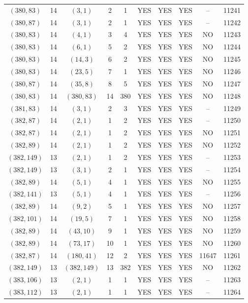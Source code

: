 \begin{longtable}{|c|c|c|c|c|c|c|c|c|c|}
$(380, 83)$ & 14 & $(3, 1)$ & 2 & 1 & YES & YES & YES & -- & 11241\\
$(380, 87)$ & 14 & $(3, 1)$ & 2 & 1 & YES & YES & YES & -- & 11242\\
$(380, 83)$ & 14 & $(4, 1)$ & 3 & 4 & YES & YES & YES & NO & 11243\\
$(380, 83)$ & 14 & $(6, 1)$ & 5 & 2 & YES & YES & YES & NO & 11244\\
$(380, 83)$ & 14 & $(14, 3)$ & 6 & 2 & YES & YES & YES & NO & 11245\\
$(380, 83)$ & 14 & $(23, 5)$ & 7 & 1 & YES & YES & YES & NO & 11246\\
$(380, 87)$ & 14 & $(35, 8)$ & 8 & 5 & YES & YES & YES & NO & 11247\\
$(380, 83)$ & 14 & $(380, 83)$ & 14 & 380 & YES & YES & YES & NO & 11248\\
$(381, 83)$ & 14 & $(3, 1)$ & 2 & 3 & YES & YES & YES & -- & 11249\\
$(382, 87)$ & 14 & $(2, 1)$ & 1 & 2 & YES & YES & YES & -- & 11250\\
$(382, 87)$ & 14 & $(2, 1)$ & 1 & 2 & YES & YES & YES & NO & 11251\\
$(382, 89)$ & 14 & $(2, 1)$ & 1 & 2 & YES & YES & YES & NO & 11252\\
$(382, 149)$ & 13 & $(2, 1)$ & 1 & 2 & YES & YES & YES & -- & 11253\\
$(382, 149)$ & 13 & $(3, 1)$ & 2 & 1 & YES & YES & YES & -- & 11254\\
$(382, 89)$ & 14 & $(5, 1)$ & 4 & 1 & YES & YES & YES & NO & 11255\\
$(382, 141)$ & 13 & $(5, 1)$ & 4 & 1 & YES & YES & YES & -- & 11256\\
$(382, 89)$ & 14 & $(9, 2)$ & 5 & 1 & YES & YES & YES & NO & 11257\\
$(382, 101)$ & 14 & $(19, 5)$ & 7 & 1 & YES & YES & YES & NO & 11258\\
$(382, 89)$ & 14 & $(43, 10)$ & 9 & 1 & YES & YES & YES & NO & 11259\\
$(382, 89)$ & 14 & $(73, 17)$ & 10 & 1 & YES & YES & YES & NO & 11260\\
$(382, 87)$ & 14 & $(180, 41)$ & 12 & 2 & YES & YES & YES & 11647 & 11261\\
$(382, 149)$ & 13 & $(382, 149)$ & 13 & 382 & YES & YES & YES & NO & 11262\\
$(383, 106)$ & 13 & $(2, 1)$ & 1 & 1 & YES & YES & YES & -- & 11263\\
$(383, 112)$ & 13 & $(2, 1)$ & 1 & 1 & YES & YES & YES & -- & 11264\\

\end{longtable}
